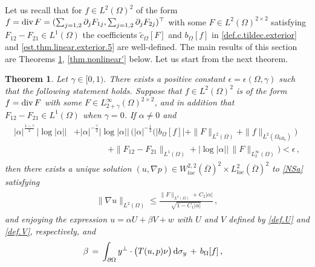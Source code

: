 \documentclass[11pt,a4paper]{article}
\newtheorem{theorem}{Theorem }[section]
\newcommand{\dd}{\,{\rm d}}
\begin{document}
Let us recall that for $f\in L^2 (\Omega)^2$ of the form $f={\rm div}\, F=(\sum_{j=1,2}\partial_j F_{1j}, \sum_{j=1,2}\partial_j F_{2j})^\top$ with some $F\in L^2(\Omega)^{2\times 2}$ satisfying $F_{12}-F_{21}\in L^1 (\Omega)$ the coefficients  $\tilde c_\Omega[F]$ and $b_\Omega [f]$ in \eqref{def.c.tildec.exterior} and \eqref{est.thm.linear.exterior.5} are well-defined.
The main results of this section are Theorems \ref{thm.nonlinear}, \ref{thm.nonlinear'} below.
Let us start from the next theorem.
\begin{theorem}\label{thm.nonlinear} Let $\gamma\in [0,1)$.
There exists a positive constant $\epsilon=\epsilon (\Omega,\gamma)$ such that the following statement holds.
Suppose that $f\in L^2 (\Omega)^2$ is of the form $f={\rm div}\, F$ with some $F\in L^\infty_{2+\gamma} (\Omega)^{2\times 2}$, and in addition that $F_{12}-F_{21} \in L^1 (\Omega)$ when $\gamma=0$. If $\alpha\ne 0$ and 
%
\begin{align}
\begin{split}
|\alpha|^{\frac{1-\gamma}{2}}\, \big |\log |\alpha| \big | & + |\alpha|^{-\frac{\gamma}{2}} \big | \log |\alpha|\big | \, 
\bigg ( |\alpha|^{-\frac12}  \big ( |b_\Omega [f]|  +  \| F \|_{L^2 (\Omega)} + \| f \|_{L^2 (\Omega_{6 R_0})} \big )  \\
& \qquad \qquad 
+ \| F_{12}-F_{21}\|_{L^1 (\Omega)} + \big | \log |\alpha| \big | \,  \| F \|_{L^\infty_{2}(\Omega)}  \bigg )  
< \epsilon\,,
\end{split}
\end{align}
%
then there exists a unique solution $(u,\nabla p)\in  W^{2,2}_{loc} (\overline{\Omega})^2 \times L^2_{loc} (\overline{\Omega})^2$ to \eqref{NSa} satisfying 
%
\begin{align}\label{est.thm.nonlinear.1}
\begin{split}
\| \nabla u \|_{L^2 (\Omega)}  
\leq \frac{\| F\|_{L^2 (\Omega)} + C_2 |\alpha |}{\sqrt{1-C_1|\alpha|}} \,, 
\end{split}
\end{align}
%
and enjoying the expression $ u = \alpha U + \beta V + w$ with $U$ and $V$ defined by \eqref{def.U} and \eqref{def.V}, respectively, and
%
\begin{align}\label{est.thm.nonlinear.2}
\begin{split}
\beta & \, = \,  \int_{\partial \Omega} y^\bot \cdot \big( T(u,p)\nu \big) \dd \sigma_{y} \,+\, b_\Omega [f]\,,
\end{split}
\end{align}

\end{theorem}
\end{document}
